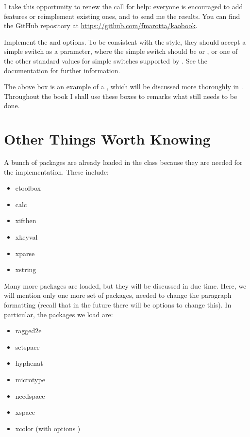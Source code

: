I take this opportunity to renew the call for help: everyone is 
encouraged to add features or reimplement existing ones, and to send me 
the results. You can find the GitHub repository at 
\url{https://github.com/fmarotta/kaobook}.

\begin{kaobox}[frametitle=To Do]
Implement the  and  options. To be 
consistent with the \KOMAScript\xspace style, they should accept a 
simple switch as a parameter, where the simple switch should be 
 or , or one of the other standard values for 
simple switches supported by \KOMAScript. See the \KOMAScript\xspace 
documentation for further information.
\end{kaobox}

The above box is an example of a , which will be 
discussed more thoroughly in . Throughout the book I 
shall use these boxes to remarks what still needs to be done.

\section{Other Things Worth Knowing}

A bunch of packages are already loaded in the class because they are 
needed for the implementation. These include:

\begin{itemize}
	\item etoolbox
	\item calc
	\item xifthen
	\item xkeyval
	\item xparse
	\item xstring
\end{itemize}

Many more packages are loaded, but they will be discussed in due time. 
Here, we will mention only one more set of packages, needed to change 
the paragraph formatting (recall that in the future there will be 
options to change this). In particular, the packages we load are:

\begin{itemize}
	\item ragged2e
	\item setspace
	\item hyphenat
	\item microtype
	\item needspace
	\item xspace
	\item xcolor (with options )
\end{itemize}

